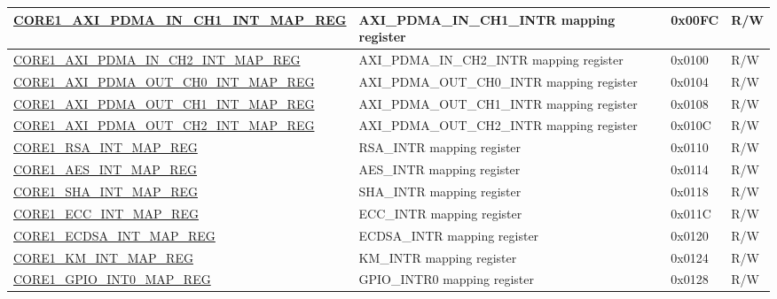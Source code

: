 \begin{longtable}{ | p{7.5cm} | p{7.2cm} | p{1.3cm} | p{1cm} | }
\hyperref[regdesc:CORE1AXIPDMAINCH1INTMAPREG]{CORE1\_AXI\_PDMA\_IN\_CH1\_INT\_MAP\_REG} & AXI\_PDMA\_IN\_CH1\_INTR mapping register & 0x00FC & R/W \\ \hline

\hyperref[regdesc:CORE1AXIPDMAINCH2INTMAPREG]{CORE1\_AXI\_PDMA\_IN\_CH2\_INT\_MAP\_REG} & AXI\_PDMA\_IN\_CH2\_INTR mapping register & 0x0100 & R/W \\ \hline

\hyperref[regdesc:CORE1AXIPDMAOUTCH0INTMAPREG]{CORE1\_AXI\_PDMA\_OUT\_CH0\_INT\_MAP\_REG} & AXI\_PDMA\_OUT\_CH0\_INTR mapping register & 0x0104 & R/W \\ \hline

\hyperref[regdesc:CORE1AXIPDMAOUTCH1INTMAPREG]{CORE1\_AXI\_PDMA\_OUT\_CH1\_INT\_MAP\_REG} & AXI\_PDMA\_OUT\_CH1\_INTR mapping register & 0x0108 & R/W \\ \hline

\hyperref[regdesc:CORE1AXIPDMAOUTCH2INTMAPREG]{CORE1\_AXI\_PDMA\_OUT\_CH2\_INT\_MAP\_REG} & AXI\_PDMA\_OUT\_CH2\_INTR mapping register & 0x010C & R/W \\ \hline

\hyperref[regdesc:CORE1RSAINTMAPREG]{CORE1\_RSA\_INT\_MAP\_REG} & RSA\_INTR mapping register & 0x0110 & R/W \\ \hline

\hyperref[regdesc:CORE1AESINTMAPREG]{CORE1\_AES\_INT\_MAP\_REG} & AES\_INTR mapping register & 0x0114 & R/W \\ \hline

\hyperref[regdesc:CORE1SHAINTMAPREG]{CORE1\_SHA\_INT\_MAP\_REG} & SHA\_INTR mapping register & 0x0118 & R/W \\ \hline

\hyperref[regdesc:CORE1ECCINTMAPREG]{CORE1\_ECC\_INT\_MAP\_REG} & ECC\_INTR mapping register & 0x011C & R/W \\ \hline

\hyperref[regdesc:CORE1ECDSAINTMAPREG]{CORE1\_ECDSA\_INT\_MAP\_REG} & ECDSA\_INTR mapping register & 0x0120 & R/W \\ \hline

\hyperref[regdesc:CORE1KMINTMAPREG]{CORE1\_KM\_INT\_MAP\_REG} & KM\_INTR mapping register & 0x0124 & R/W \\ \hline

\hyperref[regdesc:CORE1GPIOINT0MAPREG]{CORE1\_GPIO\_INT0\_MAP\_REG} & GPIO\_INTR0 mapping register & 0x0128 & R/W \\ \hline


\end{longtable}
